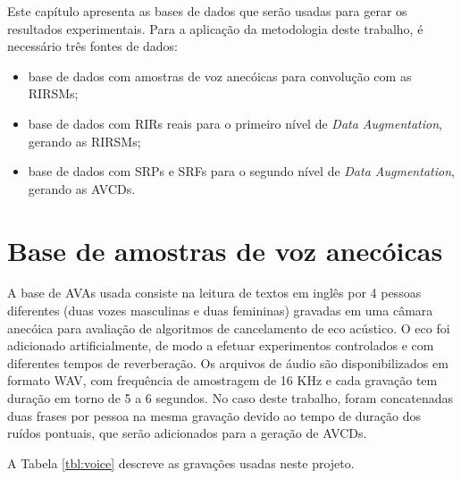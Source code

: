 Este capítulo apresenta as bases de dados que serão usadas para gerar os resultados experimentais.
Para a aplicação da metodologia deste trabalho, é necessário três fontes de dados:

\begin{itemize}
    \item base de dados com amostras de voz anecóicas para convolução com as RIRSMs;
    \item base de dados com RIRs reais para o primeiro nível de \textit{Data Augmentation}, gerando as RIRSMs;
    \item base de dados com SRPs e SRFs para o segundo nível de \textit{Data Augmentation}, gerando as AVCDs.
\end{itemize}


\section{Base de amostras de voz anecóicas}

A base de AVAs usada consiste na leitura de textos em inglês por 4 pessoas diferentes (duas vozes masculinas e duas femininas)
gravadas em uma câmara anecóica para avaliação de algoritmos de cancelamento de eco acústico. 
O eco foi adicionado artificialmente, de modo a efetuar experimentos controlados e com diferentes tempos de reverberação.
Os arquivos de áudio são disponibilizados em formato WAV, com frequência de amostragem de 16 KHz e cada gravação tem duração
em torno de 5 a 6 segundos. No caso deste trabalho, foram concatenadas duas frases por pessoa na mesma 
gravação devido ao tempo de duração dos ruídos pontuais, que serão adicionados para a geração de AVCDs.

A Tabela \ref{tbl:voice} descreve as gravações usadas neste projeto.

